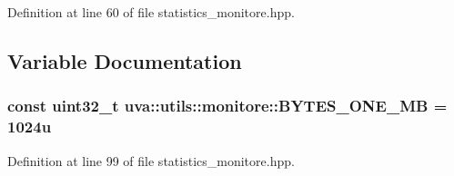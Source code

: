 Definition at line 60 of file statistics\+\_\+monitore.\+hpp.



\subsection{Variable Documentation}
\hypertarget{namespaceuva_1_1utils_1_1monitore_a286c7985e00d8d56cb91210a3e801e54}{}
\subsubsection[{B\+Y\+T\+E\+S\+\_\+\+O\+N\+E\+\_\+\+M\+B}]{\setlength{\rightskip}{0pt plus 5cm}const uint32\+\_\+t uva\+::utils\+::monitore\+::\+B\+Y\+T\+E\+S\+\_\+\+O\+N\+E\+\_\+\+M\+B = 1024u}\label{namespaceuva_1_1utils_1_1monitore_a286c7985e00d8d56cb91210a3e801e54}


Definition at line 99 of file statistics\+\_\+monitore.\+hpp.


